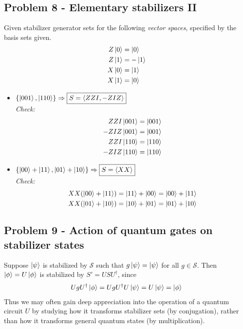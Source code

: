 \newpage
\subsection{Problem 8 - Elementary stabilizers II}
Given stabilizer generator sets for the following \textit{vector spaces}, specified by the basis sets given.
\begin{align}
    Z\ket{0} &= \ket{0}\\
    Z\ket{1} &= -\ket{1}\\
    X\ket{0} &= \ket{1}\\
    X\ket{1} &= \ket{0}
\end{align}
\begin{itemize}
    \item $\{\ket{001}, \ket{110}\} \Rightarrow \boxed{S = \langle ZZI, -ZIZ\rangle}$ \\
    \textit{Check:}
    \begin{align}
        ZZI\ket{001} &= \ket{001} \\ 
        -ZIZ\ket{001} &= \ket{001} \\ 
        ZZI\ket{110} &= \ket{110}  \\
        -ZIZ\ket{110} &= \ket{110}
    \end{align}
    \item $\{\ket{00} + \ket{11}, \ket{01} + \ket{10}\} \Rightarrow \boxed{S = \langle XX\rangle}$ \\
    \textit{Check:}
    \begin{align}
        XX(\ket{00} + \ket{11}) &= \ket{11} + \ket{00}  = \ket{00} + \ket{11}\\ 
        XX(\ket{01} + \ket{10}) &= \ket{10} + \ket{01}  = \ket{01} + \ket{10}
    \end{align}
    
\end{itemize}



\newpage
\subsection{Problem 9 - Action of quantum gates on stabilizer states}
Suppose $\ket{\psi}$ is stabilized by $\mathcal{S}$ such that $g\ket{\psi} = \ket{\psi}$ for all $g \in \mathcal{S}$. Then $\ket{\phi} = U\ket{\phi}$ is stabilized by $S' = USU^\dagger$, since
\begin{equation}
    UgU^\dagger \ket{\phi} = UgU^\dagger U \ket{\psi} = U \ket{\psi} = \ket{\phi}
\end{equation}
Thus we may often gain deep appreciation into the operation of a quantum circuit $U$ by studying how it transforms stabilizer sets (by conjugation), rather than how it transforms general quantum states (by multiplication). \\

